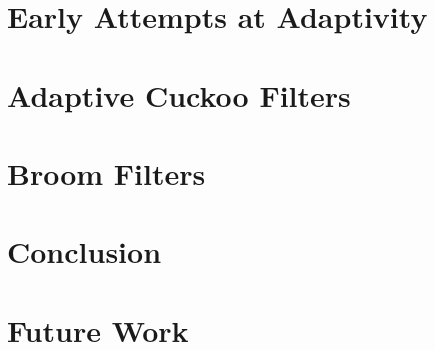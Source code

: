 \documentclass[11pt]{article}
\begin{document}


\section{Early Attempts at Adaptivity}



\section{Adaptive Cuckoo Filters}



\section{Broom Filters}



\section{Conclusion}



\section{Future Work}



 

\end{document}
